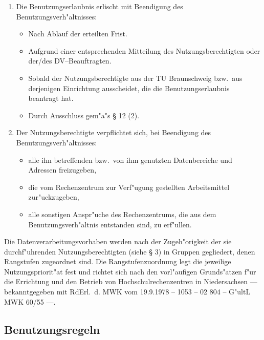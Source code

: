 \begin{enumerate}
  \item Die Benutzungserlaubnis erlischt mit Beendigung des
    Benutzungsverh"altnisses:
    \begin{itemize}
      \item Nach Ablauf der erteilten Frist.
      \item Aufgrund einer entsprechenden Mitteilung des Nutzungsberechtigten
        oder der/des DV--Beauftragten.
      \item Sobald der Nutzungsberechtigte aus der TU Braunschweig bzw.\  aus
        derjenigen Einrichtung ausscheidet, die die Benutzungserlaubnis
        beantragt hat.
      \item Durch Ausschluss gem"a"s \S{} 12 (2).
    \end{itemize}

  \item Der Nutzungsberechtigte verpflichtet sich, bei Beendigung des
    Benutzungsverh"altnisses:
    \begin{itemize}
      \item alle ihn betreffenden bzw.\  von ihm genutzten Datenbereiche und
        Adressen freizugeben,
      \item die vom Rechenzentrum zur Verf"ugung gestellten Arbeitsmittel
        zur"uckzugeben,
      \item alle sonstigen Anspr"uche des Rechenzentrums, die aus dem
        Benutzungsverh"altnis entstanden sind, zu erf"ullen.
    \end{itemize}
\end{enumerate}


Die Datenverarbeitungsvorhaben werden nach der Zugeh"origkeit der
sie durchf"uhrenden Nutzungsberechtigten (siehe \S{} 3) in Gruppen
gegliedert, denen Rangstufen zugeordnet sind. Die Rangstufenzuordnung
legt die jeweilige Nutzungspriorit"at fest und richtet sich nach
den vorl"aufigen Grunds"atzen f"ur die Errichtung und den
Betrieb von Hochschulrechenzentren in Niedersachsen --- bekanntgegeben
mit RdErl.\  d. MWK vom 19.9.1978 -- 1053 -- 02 804 -- G"ultL MWK 60/55 ---.

\subsection{Benutzungsregeln}


